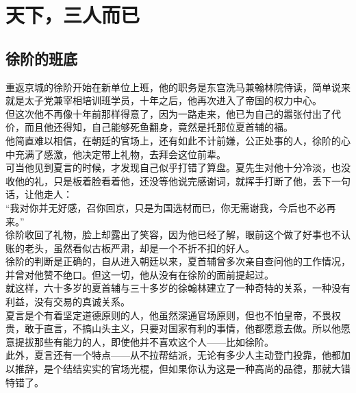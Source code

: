 \section{天下，三人而已}
\ifnum{}
	\begin{multicols}{\theparacolNo}
\fi
\subsection{徐阶的班底}
重返京城的徐阶开始在新单位上班，他的职务是东宫洗马兼翰林院侍读，简单说来就是太子党兼宰相培训班学员，十年之后，他再次进入了帝国的权力中心。\\

但这次他不再像十年前那样得意了，因为一路走来，他已为自己的嚣张付出了代价，而且他还得知，自己能够死鱼翻身，竟然是托那位夏首辅的福。\\

他简直难以相信，在朝廷的官场上，还有如此不计前嫌，公正处事的人，徐阶的心中充满了感激，他决定带上礼物，去拜会这位前辈。\\

可当他见到夏言的时候，才发现自己似乎打错了算盘。夏先生对他十分冷淡，也没收他的礼，只是板着脸看着他，还没等他说完感谢词，就挥手打断了他，丢下一句话，让他走人：\\

“我对你并无好感，召你回京，只是为国选材而已，你无需谢我，今后也不必再来。”\\

徐阶收回了礼物，脸上却露出了笑容，因为他已经了解，眼前这个做了好事也不认账的老头，虽然看似古板严肃，却是一个不折不扣的好人。\\

徐阶的判断是正确的，自从进入朝廷以来，夏首辅曾多次亲自查问他的工作情况，并曾对他赞不绝口。但这一切，他从没有在徐阶的面前提起过。\\

就这样，六十多岁的夏首辅与三十多岁的徐翰林建立了一种奇特的关系，一种没有利益，没有交易的真诚关系。\\

夏言是个有着坚定道德原则的人，他虽然深通官场原则，但也不怕皇帝，不畏权贵，敢于直言，不搞山头主义，只要对国家有利的事情，他都愿意去做。所以他愿意提拔那些有能力的人，即使他并不喜欢这个人——比如徐阶。\\

此外，夏言还有一个特点——从不拉帮结派，无论有多少人主动登门投靠，他都加以推辞，是个结结实实的官场光棍，但如果你认为这是一种高尚的品德，那就大错特错了。\\


\end{multicols}
